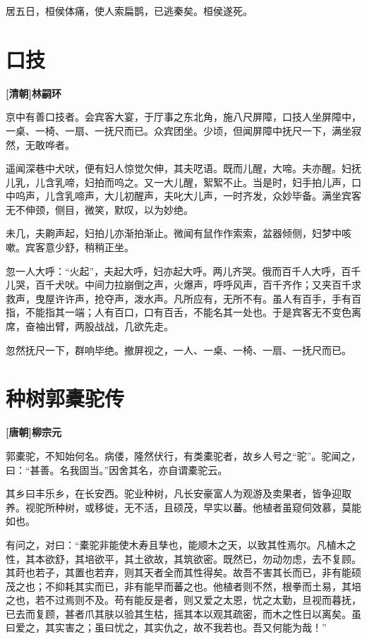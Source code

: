 \documentclass[UTF8,titlepage,oneside]{ctexbook}
\begin{document}
居五日，桓侯体痛，使人索扁鹊，已逃秦矣。桓侯遂死。


\chapter*{口技}
\begin{center}
	\textbf{[清朝]林嗣环}
\end{center}

京中有善口技者。会宾客大宴，于厅事之东北角，施八尺屏障，口技人坐屏障中，一桌、一椅、一扇、一抚尺而已。众宾团坐。少顷，但闻屏障中抚尺一下，满坐寂然，无敢哗者。

遥闻深巷中犬吠，便有妇人惊觉欠伸，其夫呓语。既而儿醒，大啼。夫亦醒。妇抚儿乳，儿含乳啼，妇拍而呜之。又一大儿醒，絮絮不止。当是时，妇手拍儿声，口中呜声，儿含乳啼声，大儿初醒声，夫叱大儿声，一时齐发，众妙毕备。满坐宾客无不伸颈，侧目，微笑，默叹，以为妙绝。

未几，夫齁声起，妇拍儿亦渐拍渐止。微闻有鼠作作索索，盆器倾侧，妇梦中咳嗽。宾客意少舒，稍稍正坐。

忽一人大呼：“火起”，夫起大呼，妇亦起大呼。两儿齐哭。俄而百千人大呼，百千儿哭，百千犬吠。中间力拉崩倒之声，火爆声，呼呼风声，百千齐作；又夹百千求救声，曳屋许许声，抢夺声，泼水声。凡所应有，无所不有。虽人有百手，手有百指，不能指其一端；人有百口，口有百舌，不能名其一处也。于是宾客无不变色离席，奋袖出臂，两股战战，几欲先走。

忽然抚尺一下，群响毕绝。撤屏视之，一人、一桌、一椅、一扇、一抚尺而已。


\chapter*{种树郭橐驼传}
\begin{center}
	\textbf{[唐朝]柳宗元}
\end{center}

郭橐驼，不知始何名。病偻，隆然伏行，有类橐驼者，故乡人号之“驼”。驼闻之，曰：“甚善。名我固当。”因舍其名，亦自谓橐驼云。

其乡曰丰乐乡，在长安西。驼业种树，凡长安豪富人为观游及卖果者，皆争迎取养。视驼所种树，或移徙，无不活，且硕茂，早实以蕃。他植者虽窥伺效慕，莫能如也。

有问之，对曰：“橐驼非能使木寿且孳也，能顺木之天，以致其性焉尔。凡植木之性，其本欲舒，其培欲平，其土欲故，其筑欲密。既然已，勿动勿虑，去不复顾。其莳也若子，其置也若弃，则其天者全而其性得矣。故吾不害其长而已，非有能硕茂之也；不抑耗其实而已，非有能早而蕃之也。他植者则不然，根拳而土易，其培之也，若不过焉则不及。苟有能反是者，则又爱之太恩，忧之太勤，旦视而暮抚，已去而复顾，甚者爪其肤以验其生枯，摇其本以观其疏密，而木之性日以离矣。虽曰爱之，其实害之；虽曰忧之，其实仇之，故不我若也。吾又何能为哉！”
\end{document}
